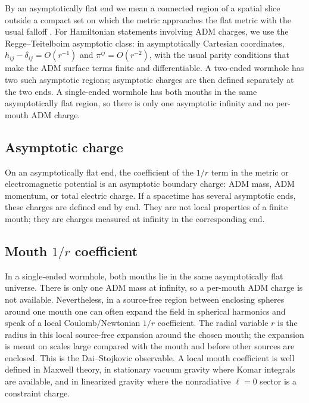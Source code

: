 \documentclass[aps,prd,10pt,onecolumn,nofootinbib,superscriptaddress,floatfix]{revtex4-2}
\begin{document}
By an asymptotically flat end we mean a connected region of a spatial slice
outside a compact set on which the metric approaches the flat metric with the
usual falloff
\cite{ArnowittDeserMisner1962Dynamics,ReggeTeitelboim1974SurfaceIntegrals,
Bartnik1986Mass}.  For Hamiltonian statements involving ADM charges, we use
the Regge--Teitelboim asymptotic class: in asymptotically Cartesian
coordinates, $h_{ij}-\delta_{ij}=O(r^{-1})$ and $\pi^{ij}=O(r^{-2})$, with the
usual parity conditions that make the ADM surface terms finite and
differentiable.  A two-ended wormhole has two such asymptotic regions;
asymptotic charges are then defined separately at the two ends.  A
single-ended wormhole has both mouths in the same asymptotically flat region,
so there is only one asymptotic infinity and no per-mouth ADM charge.

\subsection{Asymptotic charge}

On an asymptotically flat end, the coefficient of the $1/r$ term in the metric
or electromagnetic potential is an asymptotic boundary charge: ADM mass,
ADM momentum, or total electric charge.  If a spacetime has several
asymptotic ends, these charges are defined end by end.  They are not local
properties of a finite mouth; they are charges measured at infinity in the
corresponding end.

\subsection{\texorpdfstring{Mouth $1/r$ coefficient}{Mouth 1/r coefficient}}

In a single-ended wormhole, both mouths lie in the same asymptotically flat
universe.  There is only one ADM mass at infinity, so a per-mouth ADM charge is
not available.  Nevertheless, in a source-free region between enclosing spheres
around one mouth one can often expand the field in spherical harmonics and
speak of a local Coulomb/Newtonian $1/r$ coefficient.  The radial variable $r$
is the radius in this local source-free expansion around the chosen mouth; the
expansion is meant on scales large compared with the mouth and before other
sources are enclosed.  This is the Dai--Stojkovic observable.  A local mouth
coefficient is well defined in Maxwell theory, in stationary vacuum
gravity where Komar integrals are available, and in linearized gravity where
the nonradiative $\ell=0$ sector is a constraint charge.
\end{document}
